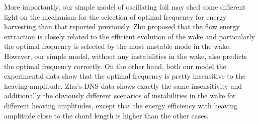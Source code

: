 More importantly, our simple model of oscillating foil may shed some different light on the mechanism for the selection of optimal frequency for energy harvesting than that reported previously.
Zhu proposed that the flow energy extraction is closely related to the efficient evolution of the wake and particularly the optimal frequency is selected by the most unstable mode in the wake.
However, our simple model, without any instabilities in the wake, also predicts the optimal frequency correctly.
On the other hand, both our model the experimental data show that the optimal frequency is pretty insensitive to the heaving amplitude.
Zhu's DNS data shows exactly the same insensitivity and additionally the obviously different scenarios of instabilities in the wake for different heaving amplitudes, except that the energy efficiency with heaving amplitude close to the chord length is higher than the other cases.
 